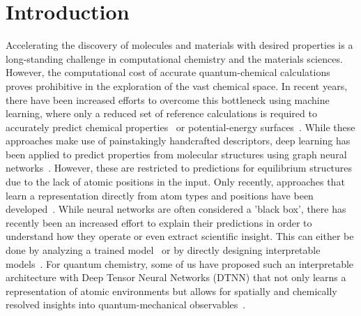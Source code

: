 \documentclass[aip,jcp,reprint,graphicx]{revtex4-1}
\begin{document}
\pacs{}

\maketitle 

\section{Introduction}
\label{sec:introduction}





Accelerating the discovery of molecules and materials with desired properties is a long-standing challenge in computational chemistry and the materials sciences.
However, the computational cost of accurate quantum-chemical calculations proves prohibitive in the exploration of the vast chemical space.
In recent years, there have been increased efforts to overcome this bottleneck using machine learning, where only a reduced set of reference calculations is required to accurately predict chemical properties~\citep{rupp2012fast,montavon2013machine,hansen2013assessment,schutt2014represent,faber2015crystal,ramakrishnan2015big,Hansen-JCPL,faber2016machine,hirn2017wavelet,faber2017fast,huo2017unified,eickenberg2017scattering,isayev2017universal,ryczko2017convolutional,luchak2017extensive} or potential-energy surfaces~\citep{behler2007generalized,behler2011atom,bartok2010gaussian,bartok2013representing,shapeev2016moment,chmiela2017machine,brockherde2017bypassing,smith2017ani,podryabinkin2017active,rowe2017machine}.
While these approaches make use of painstakingly handcrafted descriptors, deep learning has been applied to predict properties from molecular structures using graph neural networks~\citep{duvenaud2015convolutional,Kearnes2016}.
However, these are restricted to predictions for equilibrium structures due to the lack of atomic positions in the input.
Only recently, approaches that learn a representation directly from atom types and positions have been developed~\citep{schutt2017quantum, gilmer2017neural, schutt2017schnet}.
While neural networks are often considered a 'black box', there has recently been an increased effort to explain their predictions in order to understand how they operate or even extract scientific insight.
This can either be done by analyzing a trained model~\citep{Baehrens2010,simonyan2013deep,bach2015pixel,Zintgraf2017,Montavon2017,kindermans2017learning,montavon2018methods} or by directly designing interpretable models~\citep{xu2015show}.
For quantum chemistry, some of us have proposed such an interpretable architecture with Deep Tensor Neural Networks (DTNN) that not only learns a representation of atomic environments but allows for spatially and chemically resolved insights into quantum-mechanical observables~\citep{schutt2017quantum}.
\end{document}
